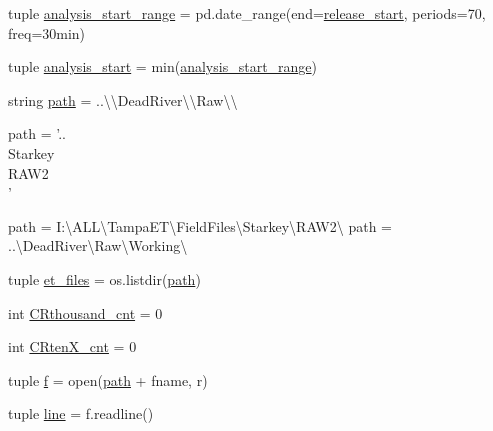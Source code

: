 \begin{DoxyCompactItemize}
tuple \hyperlink{namespace_preprocess_01_d_r_ad43a2a5b2765a6fdb69bd61e0617774a}{analysis\+\_\+start\+\_\+range} = pd.\+date\+\_\+range(end=\hyperlink{namespace_preprocess_01_d_r_ae8d2848548745ca8cb3fff24f95b8265}{release\+\_\+start}, periods=70, freq=\textquotesingle{}30min\textquotesingle{})
\item 
tuple \hyperlink{namespace_preprocess_01_d_r_a21ae2b6d07fc5f6bee079d47f29346d4}{analysis\+\_\+start} = min(\hyperlink{namespace_preprocess_01_d_r_ad43a2a5b2765a6fdb69bd61e0617774a}{analysis\+\_\+start\+\_\+range})
\item 
string \hyperlink{namespace_preprocess_01_d_r_afebb93b679a374da12eb4267b59fb9f8}{path} = \textquotesingle{}..\textbackslash{}\textbackslash{}Dead\+River\textbackslash{}\textbackslash{}\+Raw\textbackslash{}\textbackslash{}\textquotesingle{}
\begin{DoxyCompactList}\small\item\em \begin{DoxyVerb}path = '..\\Starkey\\RAW2\\'
\end{DoxyVerb}
 path = \textquotesingle{}I\+:\textbackslash{}A\+L\+L\textbackslash{}Tampa\+E\+T\textbackslash{}Field\+Files\textbackslash{}Starkey\textbackslash{}R\+A\+W2\textbackslash{}\textquotesingle{} path = \textquotesingle{}..\textbackslash{}Dead\+River\textbackslash{}Raw\textbackslash{}Working\textbackslash{}\textquotesingle{} \end{DoxyCompactList}\item 
tuple \hyperlink{namespace_preprocess_01_d_r_a561be9ad8b22bc2802b0020d8b239176}{et\+\_\+files} = os.\+listdir(\hyperlink{namespace_preprocess_01_d_r_afebb93b679a374da12eb4267b59fb9f8}{path})
\item 
int \hyperlink{namespace_preprocess_01_d_r_a9404d186af19463704b0d7514d09c28a}{C\+Rthousand\+\_\+cnt} = 0
\item 
int \hyperlink{namespace_preprocess_01_d_r_a50b6ef7f8682b5031dc5857112fcab2d}{C\+Rten\+X\+\_\+cnt} = 0
\item 
tuple \hyperlink{namespace_preprocess_01_d_r_a42c175efe72eeb61c918cffc912baa69}{f} = open(\hyperlink{namespace_preprocess_01_d_r_afebb93b679a374da12eb4267b59fb9f8}{path} + fname, \textquotesingle{}r\textquotesingle{})
\item 
tuple \hyperlink{namespace_preprocess_01_d_r_adf993ed19a62ed0125e7086027d99260}{line} = f.\+readline()
\item 

\end{DoxyCompactItemize}
